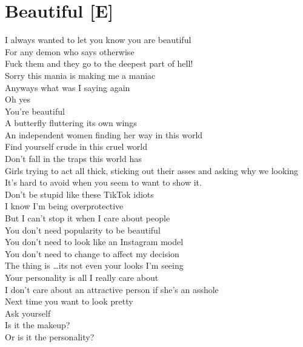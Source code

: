 \documentclass[12pt, b5paper, oneside]{book}
\begin{document}
\section{Beautiful [E]}
I always wanted to let you know you are beautiful
\\For any demon who says otherwise
\\Fuck them and they go to the deepest part of hell!
\\Sorry this mania is making me a maniac
\\Anyways what was I saying again
\\Oh yes
\\You're beautiful
\\A butterfly fluttering its own wings
\\An independent women finding her way in this world
\\Find yourself crude in this cruel world
\\Don't fall in the traps this world has
\\Girls trying to act all thick, sticking out their asses and asking why we looking
\\It's hard to avoid when you seem to want to show it.
\\Don't be stupid like these TikTok idiots
\\I know I'm being overprotective
\\But I can't stop it when I care about people
\\You don't need popularity to be beautiful
\\You don't need to look like an Instagram model
\\You don't need to change to affect my decision
\\The thing is \dots its not even your looks I'm seeing
\\Your personality is all I really care about
\\I don't care about an attractive person if she's an asshole
\\Next time you want to look pretty
\\Ask yourself
\\Is it the makeup?
\\Or is it the personality? 
\newpage
\end{document}
